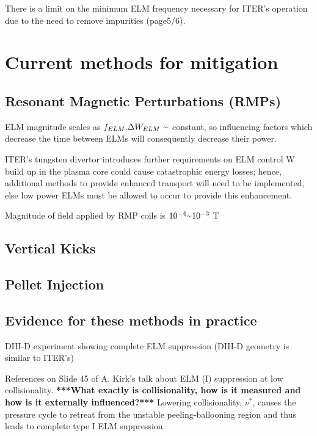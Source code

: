\documentclass[aps,prl,reprint]{revtex4-1}
\providecommand{\squiggle}{\raise.17ex\hbox{$\scriptstyle\sim$}} %
\begin{document}
There is a limit on the minimum ELM frequency necessary for ITER's operation due to the need to remove impurities (page5/6).\cite{Loarte2014a}

\section{Current methods for mitigation}\label{sec:Mitigation}

\subsection{Resonant Magnetic Perturbations (RMPs)}\label{ssec:RMP}

ELM magnitude scales as $f_{ELM}.\Delta W_{ELM}~\squiggle$ constant\cite{KirkFF}, so influencing factors which decrease the time between ELMs will consequently decrease their power.

ITER's tungsten divertor introduces further requirements on ELM control\cite{KirkFF} W build up in the plasma core could cause catastrophic energy losses; hence, additional methods to provide enhanced transport will need to be implemented, else low power ELMs must be allowed to occur to provide this enhancement.

Magnitude of field applied by RMP coils is $10^{-4} \squiggle 10^{-3}$ T\cite{Evans2015}

\subsection{Vertical Kicks}\label{ssec:Vkicks}

\subsection{Pellet Injection}\label{ssec:PInjection}


\subsection{Evidence for these methods in practice}\label{ssec:EIP}
DIII-D experiment showing complete ELM suppression (DIII-D geometry is similar to ITER's)\cite{Mordijck2011}

References on Slide 45 of A. Kirk's talk about ELM (I) suppression at low collisionality. \textbf{***What exactly is collisionality, how is it measured and how is it externally influenced?***} Lowering collisionality, $\nu^{*}$, causes the pressure cycle to retreat from the unstable peeling-ballooning region and thus leads to complete type I ELM suppression.\cite{Evans2008}
\end{document}
